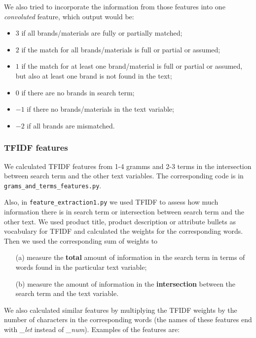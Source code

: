 \documentclass[12pt]{article}
\begin{document}
{{We also tried to incorporate the information from those features into one \emph{convoluted} feature, which output would be:
\begin{itemize}
\item $3$ if all brands/materials are fully or partially matched;
\item $2$ if the match for all brands/materials is full or partial or assumed;
\item $1$ if the match for at least one brand/material is full or partial or assumed, but also at least one brand is not found in the text;
\item $0$ if there are no brands in search term;
\item $-1$ if there no brands/materials in the text variable;
\item $-2$ if all brands are mismatched.
\end{itemize}

\subsubsection{TFIDF features}
\label{subsubsec:TFIDF_IandK}

We calculated TFIDF features from 1-4 gramms and 2-3 terms in the intersection between search term and the other text variables. The corresponding code is in \texttt{grams\_and\_terms\_features.py}.

Also, in \texttt{feature\_extraction1.py} we used TFIDF to assess how much information there is in search term or intersection  between search term and the other text. We used  product title, product description or attribute bullets as vocabulary for TFIDF and calculated the weights for the corresponding words. Then we used the corresponding sum of weights to
\begin{itemize}
\item[(a)] measure the \textbf{total} amount of information in the search term in terms of words found in the particular text variable;
\item[(b)] measure the amount of information in the \textbf{intersection} between the search term and the text variable.
\end{itemize}

We also calculated similar features by multiplying the TFIDF weights by the number of characters in the corresponding words (the names of these features end with \emph{\_let} instead of \emph{\_num}). Examples of the features are:

}}
\end{document}
